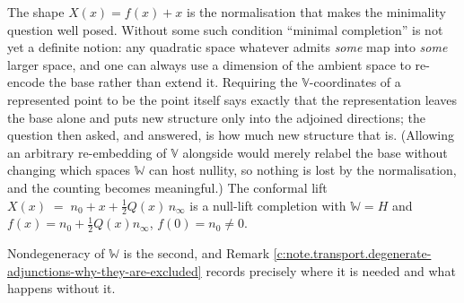 \documentclass[11pt]{article}
\theoremstyle{definition}
\theoremstyle{plain}
\providecommand{\nInf}{}\renewcommand{\nInf}{n_\infty}
\providecommand{\nO}{}\renewcommand{\nO}{n_0}
\begin{document}
The shape $X(x) = f(x) + x$ is the normalisation that makes the minimality question well posed. Without some such condition ``minimal completion'' is not yet a definite notion: any quadratic space whatever admits \emph{some} map into \emph{some} larger space, and one can always use a dimension of the ambient space to re-encode the base rather than extend it. Requiring the $\mathbb{V}$-coordinates of a represented point to be the point itself says exactly that the representation leaves the base alone and puts new structure only into the adjoined directions; the question then asked, and answered, is how much new structure that is. (Allowing an arbitrary re-embedding of $\mathbb{V}$ alongside would merely relabel the base without changing which spaces $\mathbb{W}$ can host nullity, so nothing is lost by the normalisation, and the counting becomes meaningful.) The conformal lift $X(x) \;=\; \nO + x + \tfrac12 Q(x)\, \nInf$ is a null-lift completion with $\mathbb{W} = H$ and $f(x) = \nO + \tfrac12 Q(x)\nInf$, $f(0) = \nO \neq 0$.

Nondegeneracy of $\mathbb{W}$ is the second, and Remark \ref{c:note.transport.degenerate-adjunctions-why-they-are-excluded} records precisely where it is needed and what happens without it.
\end{document}
